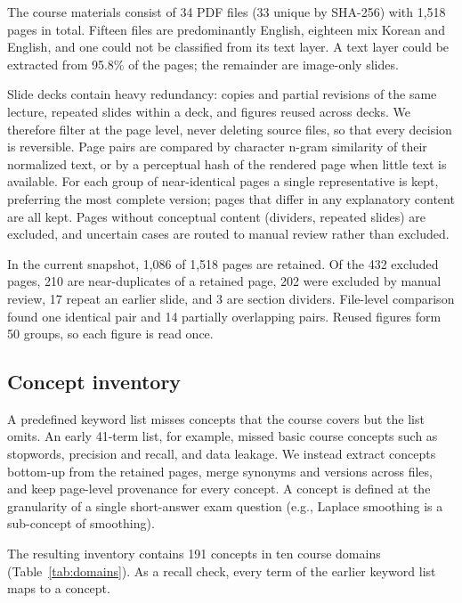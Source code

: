 The course materials consist of 34 PDF files (33 unique by SHA-256) with 1{,}518 pages in total.
Fifteen files are predominantly English, eighteen mix Korean and English, and one could not be classified from its text layer.
A text layer could be extracted from 95.8\% of the pages; the remainder are image-only slides.

Slide decks contain heavy redundancy: copies and partial revisions of the same lecture, repeated slides within a deck, and figures reused across decks.
We therefore filter at the page level, never deleting source files, so that every decision is reversible.
Page pairs are compared by character n-gram similarity of their normalized text, or by a perceptual hash of the rendered page when little text is available.
For each group of near-identical pages a single representative is kept, preferring the most complete version; pages that differ in any explanatory content are all kept.
Pages without conceptual content (dividers, repeated slides) are excluded, and uncertain cases are routed to manual review rather than excluded.

In the current snapshot, 1{,}086 of 1{,}518 pages are retained.
Of the 432 excluded pages, 210 are near-duplicates of a retained page, 202 were excluded by manual review, 17 repeat an earlier slide, and 3 are section dividers.
File-level comparison found one identical pair and 14 partially overlapping pairs.
Reused figures form 50 groups, so each figure is read once.

\subsection{Concept inventory}
\label{sec:method-concepts}

A predefined keyword list misses concepts that the course covers but the list omits.
An early 41-term list, for example, missed basic course concepts such as stopwords, precision and recall, and data leakage.
We instead extract concepts bottom-up from the retained pages, merge synonyms and versions across files, and keep page-level provenance for every concept.
A concept is defined at the granularity of a single short-answer exam question (e.g., Laplace smoothing is a sub-concept of smoothing).

The resulting inventory contains 191 concepts in ten course domains
(Table~\ref{tab:domains}).
As a recall check, every term of the earlier keyword list maps to a concept.

